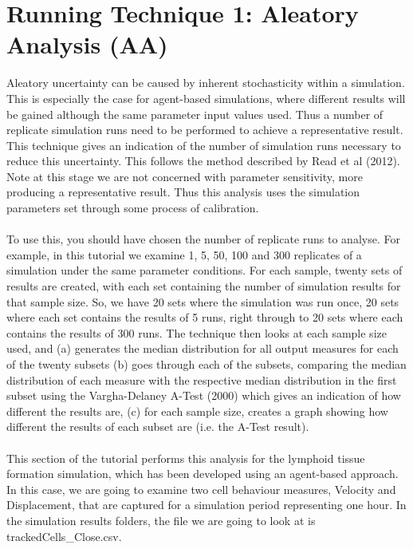 \documentclass[a4paper,11pt]{article}
\begin{document}
\section{Running Technique 1: Aleatory Analysis (AA)}
\noindent Aleatory uncertainty can be caused by inherent stochasticity within a simulation. This is especially the case for agent-based simulations, where different results will be gained although the same parameter input values used. Thus a number of replicate simulation runs need to be performed to achieve a representative result. This technique gives an indication of the number of simulation runs necessary to reduce this uncertainty. This follows the method described by Read et al (2012).  Note at this stage we are not concerned with parameter sensitivity, more producing a representative result.  Thus this analysis uses the simulation parameters set through some process of calibration.\\
\\
To use this, you should have chosen the number of replicate runs to analyse. For example, in this tutorial we examine 1, 5, 50, 100 and 300 replicates of a simulation under the same parameter conditions.  For each sample, twenty sets of results are created, with each set containing the number of simulation results for that sample size.  So, we have 20 sets where the simulation was run once, 20 sets where each set contains the results of 5 runs, right through to 20 sets where each contains the results of 300 runs. The technique then looks at each sample size used, and (a) generates the median distribution for all output measures for each of the twenty subsets (b) goes through each of the subsets, comparing the median distribution of each measure with the respective median distribution in the first subset using the Vargha-Delaney A-Test (2000) which gives an indication of how different the results are, (c) for each sample size, creates a graph showing how different the results of each subset are (i.e. the A-Test result).\\
\\
This section of the tutorial performs this analysis for the lymphoid tissue formation simulation, which has been developed using an agent-based approach. In this case, we are going to examine two cell behaviour measures, Velocity and Displacement, that are captured for a simulation period representing one hour. In the simulation results folders, the file we are going to look at is trackedCells\_Close.csv.
\end{document}
